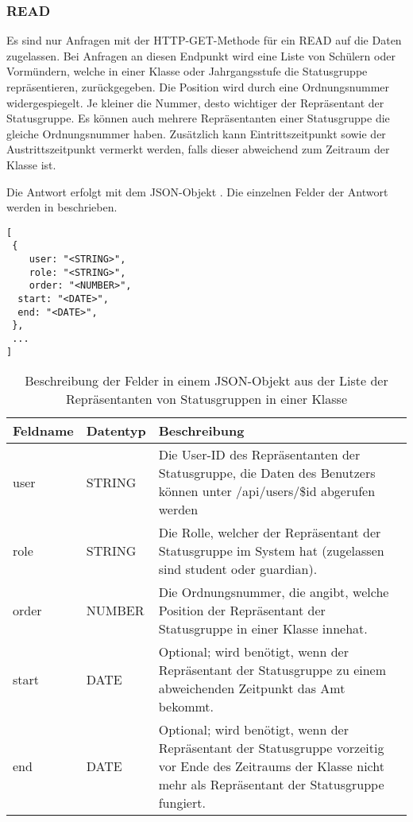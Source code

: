 \subsubsection{READ}
\label{sec:rest:api:classes:id:representatives:read}
Es sind nur Anfragen mit der HTTP-GET-Methode für ein READ auf die Daten zugelassen.
Bei Anfragen an diesen Endpunkt wird eine Liste von Schülern oder Vormündern, welche in einer Klasse oder Jahrgangsstufe die Statusgruppe repräsentieren, zurückgegeben.
Die Position wird durch eine Ordnungsnummer widergespiegelt. Je kleiner die Nummer, desto wichtiger der Repräsentant der Statusgruppe.
Es können auch mehrere Repräsentanten einer Statusgruppe die gleiche Ordnungsnummer haben.
Zusätzlich kann Eintrittszeitpunkt sowie der Austrittszeitpunkt vermerkt werden, falls dieser abweichend zum Zeitraum der Klasse ist.

Die Antwort erfolgt mit dem JSON-Objekt . 
Die einzelnen Felder der Antwort werden in  beschrieben.

\begin{lstlisting}[caption={JSON-Antwort für einen GET-Aufruf des Pfads /api/classes/\$id/representatives},label={lst:code:rest:api:classes:id:representatives:read:ret},frame=tlrb]
[ 
 { 
	user: "<STRING>",
	role: "<STRING>",
	order: "<NUMBER>",
  start: "<DATE>",
  end: "<DATE>",
 },
 ... 
]
\end{lstlisting}

\begin{longtable}{|p{}|p{}|p{}|}
		\caption{Beschreibung der Felder in einem JSON-Objekt aus der Liste der Repräsentanten von Statusgruppen in einer Klasse}
\endfoot
		\caption{Beschreibung der Felder in einem JSON-Objekt aus der Liste der Repräsentanten von Statusgruppen in einer Klasse}
		\label{tab:rest:api:classes:id:representatives:read:ret}
\endlastfoot 
\hline
			\textbf{Feldname} & \textbf{Datentyp} & \textbf{Beschreibung} \\ \hline
\endhead
user & STRING & Die User-ID des Repräsentanten der Statusgruppe, die Daten des Benutzers können unter /api/users/\$id abgerufen werden \\ \hline
role & STRING & Die Rolle, welcher der Repräsentant der Statusgruppe im System hat (zugelassen sind student oder guardian). \\ \hline
order & NUMBER & Die Ordnungsnummer, die angibt, welche Position der Repräsentant der Statusgruppe in einer Klasse innehat. \\ \hline
start & DATE & Optional; wird benötigt, wenn der Repräsentant der Statusgruppe zu einem abweichenden Zeitpunkt das Amt bekommt. \\ \hline
end & DATE & Optional; wird benötigt, wenn der Repräsentant der Statusgruppe vorzeitig vor Ende des Zeitraums der Klasse nicht mehr als Repräsentant der Statusgruppe fungiert. \\ \hline
\end{longtable}
